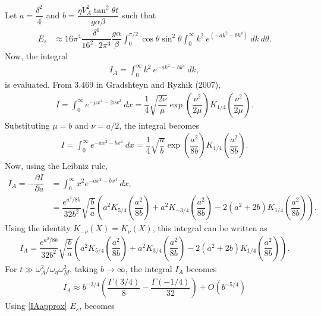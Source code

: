 \documentclass[12pt,psfig]{article}
\begin{document}
Let $a=\dfrac{\delta^2}{4}$ and $b=\dfrac{\eta V_A^2\tan^2\theta t}{g\alpha\beta}$ such that
\begin{align*}
E_s&\approx 16\pi^4\dfrac{\delta^6}{16^2\cdot 2\pi^3}\dfrac{g\alpha}{\beta } \int_{0}^{\pi/2}\cos\theta \sin^2\theta \int_{0}^{\infty}k^2 \ e^{(-ak^2-b k^4)}  \ dk \ d\theta.
\end{align*}
Now, the integral 
\begin{align*}
I_A=\int_{0}^{\infty} k^2 \ e^{-ak^2-b k^4} \ dk,
\end{align*}
is evaluated. From 3.469 in Gradshteyn and Ryzhik (2007), 
\begin{align*}
I=\int_{0}^{\infty}e^{-\mu x^4-2\nu x^2} \ dx=\dfrac{1}{4}\sqrt{\dfrac{2\nu}{\mu}}\exp\left(\dfrac{\nu^2}{2\mu}\right)K_{1/4}\left(\dfrac{\nu^2}{2\mu}\right).
\end{align*}
Substituting $\mu=b$ and $\nu=a/2$, the integral becomes
\begin{align*}
I=\int_{0}^{\infty}e^{-ax^2-bx^4} \ dx=\dfrac{1}{4}\sqrt{\dfrac{a}{b}}\exp\left(\dfrac{a^2}{8b}\right)K_{1/4}\left(\dfrac{a^2}{8b}\right).
\end{align*} 
Now, using the Leibniz rule,
\begin{align*}
I_A=-\dfrac{\partial I}{\partial a}&=\int_{0}^{\infty}x^2 e^{-ax^2-b x^4} \ dx,\\ &=\dfrac{e^{a^2/8b}}{32 b^2}\sqrt{\dfrac{b}{a}}\left(a^2 K_{5/4}\left(\dfrac{a^2}{8 b}\right)+a^2 K_{-3/4}\left(\dfrac{a^2}{8 b}\right)-2 \left(a^2+2 b\right) K_{1/4}\left(\dfrac{a^2}{8 b}\right)\right).
\end{align*}
Using the identity $K_{-\nu}(X)=K_{\nu}(X)$, this integral can be written as
\begin{align*}
I_A=\dfrac{e^{a^2/8b}}{32 b^2}\sqrt{\dfrac{b}{a}}\left(a^2 K_{5/4}\left(\dfrac{a^2}{8 b}\right)+a^2 K_{3/4}\left(\dfrac{a^2}{8 b}\right)-2 \left(a^2+2 b\right) K_{1/4}\left(\dfrac{a^2}{8 b}\right)\right).
\end{align*}
For $t\gg \omega_A^2/\omega_\eta\omega_M^2$, taking $b\rightarrow\infty$, the integral $I_A$ becomes
\begin{align}
I_A\approx b^{-3/4} \left(\dfrac{\Gamma \left(3/4\right)}{8}-\dfrac{\Gamma \left(-1/4\right)}{32}\right)+O\left(b^{-5/4}\right) \label{IAapprox}
\end{align}
Using \eqref{IAapprox} $E_s$, becomes
\end{document}
